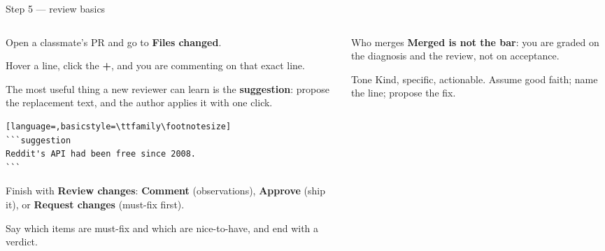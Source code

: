 \documentclass[9pt,aspectratio=169]{beamer}
\begin{document}
\begin{frame}[fragile]{Step 5 --- review basics}
    \begin{columns}[T]
        \begin{column}{0.6\textwidth}
            Open a classmate's PR and go to \textbf{Files changed}. 
            
            \medskip
            Hover a line, click the \textbf{+}, and you are commenting on that exact line. 
            
            \medskip
            The most useful thing a new reviewer can learn is the \textbf{suggestion}: propose the replacement text, and the author applies it with one click.
\begin{lstlisting}[language=,basicstyle=\ttfamily\footnotesize]
```suggestion
Reddit's API had been free since 2008.
```
\end{lstlisting}
            Finish with \textbf{Review changes}: \textbf{Comment} (observations), \textbf{Approve} (ship it), or \textbf{Request changes} (must-fix first). 
            
            \medskip
            Say which items are must-fix and which are nice-to-have, and end with a verdict.
        \end{column}
        \begin{column}{0.35\textwidth}
            \begin{alertblock}{Who merges}
                \small \textbf{Merged is not the bar}: you are graded on the diagnosis and the review, not on acceptance.
            \end{alertblock}
            \begin{alertblock}{Tone}
                \small Kind, specific, actionable. Assume good faith; name the line; propose the fix.
            \end{alertblock}
        \end{column}
    \end{columns}
\end{frame}
\end{document}
